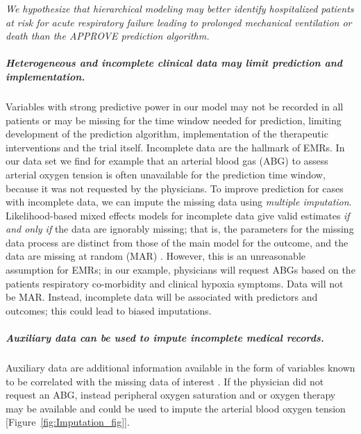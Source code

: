 \documentclass[11pt,notitlepage]{article}
\begin{document}
\emph{We hypothesize that hierarchical modeling may better identify hospitalized patients at risk for acute respiratory failure leading to prolonged mechanical ventilation or death than the APPROVE prediction algorithm.}

\subparagraph*{Heterogeneous and incomplete clinical data may limit prediction and implementation.}
Variables with strong predictive power in our model may not be recorded in all patients or may be missing for the time window needed for prediction, limiting development of the prediction algorithm, implementation of the therapeutic interventions and the trial itself. Incomplete data are the hallmark of EMRs. In our data set we find for example that an arterial blood gas (ABG) to assess arterial oxygen tension is often unavailable for the prediction time window, because it was not requested by the physicians. To improve prediction for cases with incomplete data, we can impute the missing data using \textit{multiple imputation}. Likelihood-based mixed effects models for incomplete data give valid estimates \textit{if and only if } the data are ignorably missing; that is, the parameters for the missing data process are distinct from those of the main model for the outcome, and the data are missing at random (MAR) \cite{Rubin_1976}. However, this is an unreasonable assumption for EMRs; in our example, physicians will request ABGs based on the patients respiratory co-morbidity and clinical hypoxia symptoms. Data will not be MAR. Instead, incomplete data will be associated with predictors and outcomes; this could lead to biased imputations.

\subparagraph*{Auxiliary data can be used to impute incomplete medical records.} Auxiliary data are additional information available in the form of variables known to be correlated with the missing data of interest \cite{Daniels24571539}. If the physician did not request an ABG, instead peripheral oxygen saturation and or oxygen therapy may be available and could be used to impute the arterial blood oxygen tension [Figure~\ref{fig:Imputation_fig}]. 
\end{document}
